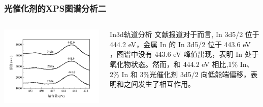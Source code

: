 \documentclass[xetex,compress]{mybeamer}
\begin{document}
\begin{frame}
\frametitle{光催化剂的XPS图谱分析二}
\begin{columns}
\begin{block}{}
\centering
\includegraphics[width=\linewidth]{figures/三氧化二铟3D.jpg} 
\end{block}
\begin{block}{In3d轨道分析}
文献报道对于而言, In 3d5/2 位于 444.2 eV，金属 In 的 In 3d5/2 位于 443.6 eV  ，图谱中没有 443.6 eV 峰值出现，表明 In 处于氧化物状态。然而，和 444.2 eV 相比,1\% In、2\% In 和 3\%光催化剂 3d5/2 向低能端偏移，表明和之间发生了相互作用。
\end{block}
\end{columns}
\end{frame}
\end{document}
